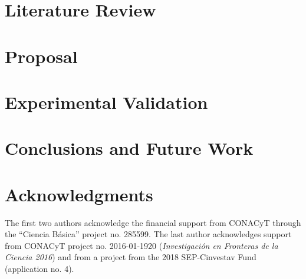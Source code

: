 \documentclass[twoside]{article}
\begin{document}
\section{Literature Review}
\label{Sec:LiteratureReview}


\section{Proposal}
\label{Sec:Proposal}


\section{Experimental Validation}
\label{Sec:ExperimentalValidation}


\section{Conclusions and Future Work}
\label{Sec:Conclusion}


\section*{Acknowledgments}
The first two authors acknowledge the financial support from CONACyT through the ``Ciencia B\'asica'' project no. 285599.
The last author acknowledges support from CONACyT 
project no. 2016-01-1920 ({\em Investigaci\'{o}n en Fronteras de la Ciencia 2016})
and from a project from the 2018 SEP-Cinvestav Fund (application no. 4).


\small



\end{document}
